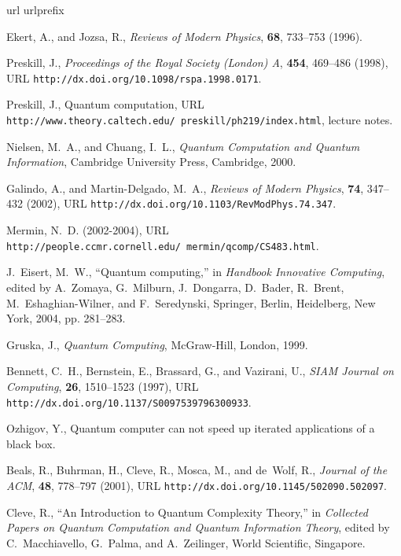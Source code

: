 \begin{thebibliography}{10}
\providecommand{\enquote}[1]{``#1''}
\expandafter\ifx\csname url\endcsname\relax
  \def\url#1{\texttt{#1}}\fi
\expandafter\ifx\csname urlprefix\endcsname\relax\def\urlprefix{URL }\fi

Ekert, A., and Jozsa, R., \emph{Reviews of Modern Physics}, \textbf{68},
  733--753 (1996).

Preskill, J., \emph{Proceedings of the Royal Society (London) A}, \textbf{454},
  469--486 (1998), \urlprefix\url{http://dx.doi.org/10.1098/rspa.1998.0171}.

Preskill, J., Quantum computation,
  \urlprefix\url{http://www.theory.caltech.edu/~preskill/ph219/index.html},
  lecture notes.

Nielsen, M.~A., and Chuang, I.~L., \emph{Quantum Computation and Quantum
  Information}, Cambridge University Press, Cambridge, 2000.

Galindo, A., and Martin-Delgado, M.~A., \emph{Reviews of Modern Physics},
  \textbf{74}, 347--432 (2002),
  \urlprefix\url{http://dx.doi.org/10.1103/RevModPhys.74.347}.

Mermin, N.~D. (2002-2004),
  \urlprefix\url{http://people.ccmr.cornell.edu/~mermin/qcomp/CS483.html}.

J.~Eisert, M.~W., \enquote{Quantum computing,} in \emph{Handbook Innovative
  Computing}, edited by A.~Zomaya, G.~Milburn, J.~Dongarra, D.~Bader, R.~Brent,
  M.~Eshaghian-Wilner, and F.~Seredynski, Springer, Berlin, Heidelberg, New
  York, 2004, pp. 281--283.

Gruska, J., \emph{Quantum Computing}, McGraw-Hill, London, 1999.

Bennett, C.~H., Bernstein, E., Brassard, G., and Vazirani, U., \emph{SIAM
  Journal on Computing}, \textbf{26}, 1510--1523 (1997),
  \urlprefix\url{http://dx.doi.org/10.1137/S0097539796300933}.

Ozhigov, Y., Quantum computer can not speed up iterated applications of a black
  box.

Beals, R., Buhrman, H., Cleve, R., Mosca, M., and de~Wolf, R., \emph{Journal of
  the ACM}, \textbf{48}, 778--797 (2001),
  \urlprefix\url{http://dx.doi.org/10.1145/502090.502097}.

Cleve, R., \enquote{An Introduction to Quantum Complexity Theory,} in
  \emph{Collected Papers on Quantum Computation and Quantum Information
  Theory}, edited by C.~Macchiavello, G.~Palma, and A.~Zeilinger, World
  Scientific, Singapore.


\end{thebibliography}
